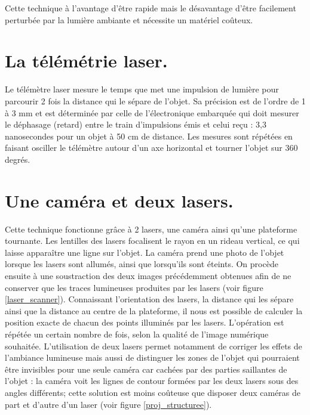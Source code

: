 \documentclass[a4paper,10pt]{report}
\begin{document}
Cette technique à l’avantage d’être rapide mais le désavantage d’être facilement perturbée par la lumière ambiante et nécessite un matériel coûteux.

\section{La télémétrie laser.}
Le télémètre laser mesure le temps que met une impulsion de lumière pour parcourir 2 fois la distance qui le sépare de l'objet. Sa précision est de l'ordre de 1 à 3 mm et est déterminée par celle de l'électronique embarquée qui doit mesurer le déphasage (retard) entre le train d'impulsions émis et celui reçu : 3,3 nanosecondes pour un objet à 50 cm de distance. Les mesures sont répétées en faisant osciller le télémètre autour d'un axe horizontal et tourner l'objet sur 360 degrés.

\section{Une caméra et deux lasers.}
Cette technique fonctionne grâce à 2 lasers, une caméra ainsi qu’une plateforme tournante. Les lentilles des lasers focalisent le rayon en un rideau vertical, ce qui laisse apparaître une ligne sur l’objet. La caméra prend une photo de l’objet lorsque les lasers sont allumés, ainsi que lorsqu’ils sont éteints. On procède ensuite à une soustraction des deux images précédemment obtenues afin de ne conserver que les traces lumineuses
produites par les lasers (voir figure \ref{laser_scanner}). Connaissant l’orientation des lasers, la distance qui les sépare ainsi que la distance au centre de la plateforme, il nous est possible de calculer la position exacte de chacun des points illuminés par les lasers. L’opération est répétée un certain nombre de fois, selon la qualité de l’image numérique souhaitée. L'utilisation de deux lasers permet notamment de corriger les effets de l'ambiance lumineuse mais aussi\cite{dsls} de distinguer les zones de l'objet qui pourraient être invisibles pour une seule caméra car cachées par des parties saillantes de l'objet : la caméra voit les lignes de contour formées par les deux lasers sous des angles différents; cette solution est moins coûteuse que disposer deux caméras de part et d'autre d'un laser (voir figure \ref{proj_structuree}).
\end{document}
